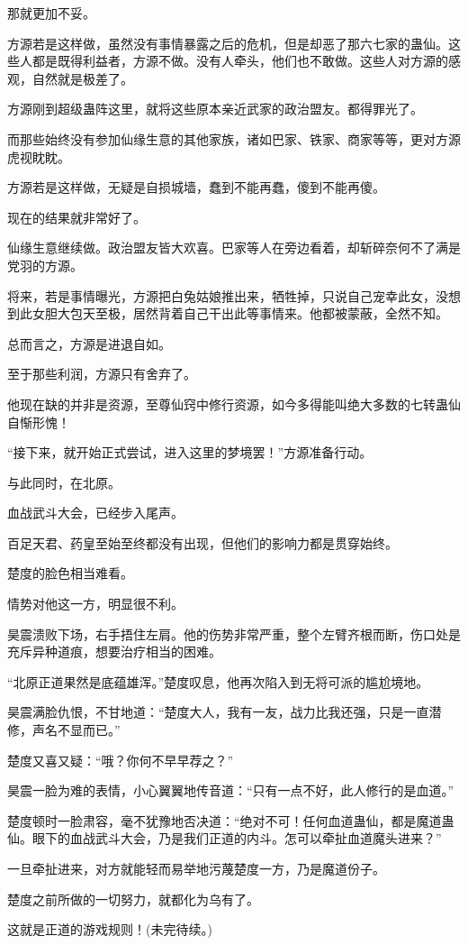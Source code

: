 \begin{this_body}
那就更加不妥。

方源若是这样做，虽然没有事情暴露之后的危机，但是却恶了那六七家的蛊仙。这些人都是既得利益者，方源不做。没有人牵头，他们也不敢做。这些人对方源的感观，自然就是极差了。

方源刚到超级蛊阵这里，就将这些原本亲近武家的政治盟友。都得罪光了。

而那些始终没有参加仙缘生意的其他家族，诸如巴家、铁家、商家等等，更对方源虎视眈眈。

方源若是这样做，无疑是自损城墙，蠢到不能再蠢，傻到不能再傻。

现在的结果就非常好了。

仙缘生意继续做。政治盟友皆大欢喜。巴家等人在旁边看着，却斩碎奈何不了满是党羽的方源。

将来，若是事情曝光，方源把白兔姑娘推出来，牺牲掉，只说自己宠幸此女，没想到此女胆大包天至极，居然背着自己干出此等事情来。他都被蒙蔽，全然不知。

总而言之，方源是进退自如。

至于那些利润，方源只有舍弃了。

他现在缺的并非是资源，至尊仙窍中修行资源，如今多得能叫绝大多数的七转蛊仙自惭形愧！

“接下来，就开始正式尝试，进入这里的梦境罢！”方源准备行动。

与此同时，在北原。

血战武斗大会，已经步入尾声。

百足天君、药皇至始至终都没有出现，但他们的影响力都是贯穿始终。

楚度的脸色相当难看。

情势对他这一方，明显很不利。

昊震溃败下场，右手捂住左肩。他的伤势非常严重，整个左臂齐根而断，伤口处是充斥异种道痕，想要治疗相当的困难。

“北原正道果然是底蕴雄浑。”楚度叹息，他再次陷入到无将可派的尴尬境地。

昊震满脸仇恨，不甘地道：“楚度大人，我有一友，战力比我还强，只是一直潜修，声名不显而已。”

楚度又喜又疑：“哦？你何不早早荐之？”

昊震一脸为难的表情，小心翼翼地传音道：“只有一点不好，此人修行的是血道。”

楚度顿时一脸肃容，毫不犹豫地否决道：“绝对不可！任何血道蛊仙，都是魔道蛊仙。眼下的血战武斗大会，乃是我们正道的内斗。怎可以牵扯血道魔头进来？”

一旦牵扯进来，对方就能轻而易举地污蔑楚度一方，乃是魔道份子。

楚度之前所做的一切努力，就都化为乌有了。

这就是正道的游戏规则！(未完待续。)

\end{this_body}

